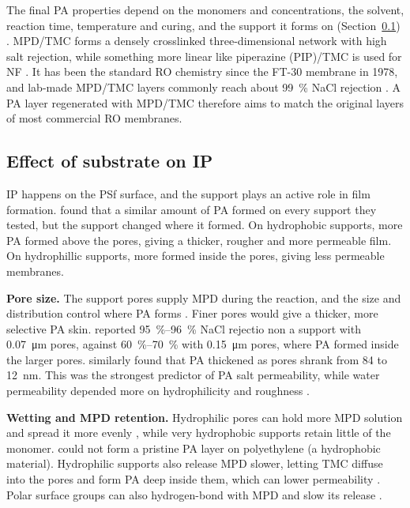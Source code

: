 The final PA properties depend on the monomers and concentrations, the solvent, reaction time, temperature and curing, and the support it forms on (Section~\ref{sec:substrate})
\citep{GhoshHoek2009}. MPD/TMC forms a densely crosslinked three-dimensional network with high salt rejection, while something more linear like piperazine (PIP)/TMC is used for NF \citep{Wang2026,Chen2024}. It has been the standard RO chemistry since the FT-30 membrane in 1978, and lab-made MPD/TMC layers commonly reach about \qty{99}{\percent} NaCl rejection \citep{Wang2026,Huang2022}. A PA layer regenerated with MPD/TMC therefore aims to match the original layers of most commercial RO membranes. 

\subsection{Effect of substrate on IP}
\label{sec:substrate}
IP happens on the PSf surface, and the support plays an active role in film formation. \citet{GhoshHoek2009} found that a similar amount of PA formed on every support they tested, but the support changed where it formed. On hydrophobic supports, more PA formed above the pores, giving a thicker, rougher and more permeable film. On hydrophillic supports, more formed inside the pores, giving less permeable membranes. 

\textbf{Pore size.}
The support pores supply MPD during the reaction, and the size and distribution control where PA forms \citep{GhoshHoek2009}. Finer pores would give a thicker, more selective PA skin. \citet{Singh2006} reported \qtyrange{95}{96}{\percent} NaCl rejectio non a support with \qty{0.07}{\micro\metre} pores, against \qtyrange{60}{70}{\percent} with \qty{0.15}{\micro\metre} pores, where PA formed inside the larger pores. \citet{Misdan2013} similarly found that PA thickened as pores shrank from \qty{84}{} to \qty{12}{\nano\metre}. This was the strongest predictor of PA salt permeability, while water permeability depended more on hydrophilicity and roughness \citep{GhoshHoek2009}.

\textbf{Wetting and MPD retention.}
Hydrophilic pores can hold more MPD solution and spread it more evenly \citep{Huang2022}, while very hydrophobic supports retain little of the monomer. \citet{Huang2022} could not form a pristine PA layer on polyethylene (a hydrophobic material). Hydrophilic supports also release MPD slower, letting TMC diffuse into the pores and form PA deep inside them, which can lower permeability \citep{GhoshHoek2009}. Polar surface groups can also hydrogen-bond with MPD and slow its release \citep{GhoshHoek2009}.


